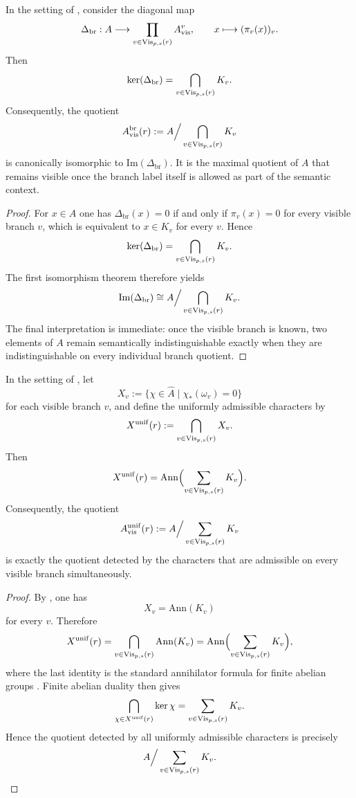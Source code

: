 \begin{theorem}\label{thm:branch-sensitive-visible-quotient}
In the setting of , consider the diagonal map
\[
\Delta_{\mathrm{br}}:A\longrightarrow \prod_{v\in \mathrm{Vis}_{p,s}(r)} A_{\mathrm{vis}}^v,
\qquad
x\longmapsto (\pi_v(x))_v.
\]
Then
\[
\ker(\Delta_{\mathrm{br}})=\bigcap_{v\in \mathrm{Vis}_{p,s}(r)} K_v.
\]
Consequently, the quotient
\[
A_{\mathrm{vis}}^{\mathrm{br}}(r):=A\Big/\bigcap_{v\in \mathrm{Vis}_{p,s}(r)} K_v
\]
is canonically isomorphic to $\mathrm{Im}(\Delta_{\mathrm{br}})$. It is the maximal quotient of $A$ that remains visible once the branch label itself is allowed as part of the semantic context.
\end{theorem}

\begin{proof}
For $x\in A$ one has $\Delta_{\mathrm{br}}(x)=0$ if and only if $\pi_v(x)=0$ for every visible branch $v$, which is equivalent to $x\in K_v$ for every $v$. Hence
\[
\ker(\Delta_{\mathrm{br}})=\bigcap_{v\in \mathrm{Vis}_{p,s}(r)} K_v.
\]
The first isomorphism theorem therefore yields
\[
\mathrm{Im}(\Delta_{\mathrm{br}})
\cong
A\Big/\bigcap_{v\in \mathrm{Vis}_{p,s}(r)} K_v.
\]
The final interpretation is immediate: once the visible branch is known, two elements of $A$ remain semantically indistinguishable exactly when they are indistinguishable on every individual branch quotient.
\end{proof}

\begin{theorem}\label{thm:branch-uniform-visible-quotient}
In the setting of , let
\[
X_v:=\{\chi\in \widehat A\mid \chi_*(\omega_v)=0\}
\]
for each visible branch $v$, and define the uniformly admissible characters by
\[
X^{\mathrm{unif}}(r):=\bigcap_{v\in \mathrm{Vis}_{p,s}(r)} X_v.
\]
Then
\[
X^{\mathrm{unif}}(r)=\mathrm{Ann}\Bigl(\sum_{v\in \mathrm{Vis}_{p,s}(r)} K_v\Bigr).
\]
Consequently, the quotient
\[
A_{\mathrm{vis}}^{\mathrm{unif}}(r):=A\Big/\sum_{v\in \mathrm{Vis}_{p,s}(r)} K_v
\]
is exactly the quotient detected by the characters that are admissible on every visible branch simultaneously.
\end{theorem}

\begin{proof}
By , one has
\[
X_v=\mathrm{Ann}(K_v)
\]
for every $v$. Therefore
\[
X^{\mathrm{unif}}(r)
=
\bigcap_{v\in \mathrm{Vis}_{p,s}(r)} \mathrm{Ann}(K_v)
=
\mathrm{Ann}\Bigl(\sum_{v\in \mathrm{Vis}_{p,s}(r)} K_v\Bigr),
\]
where the last identity is the standard annihilator formula for finite abelian groups \cite[Chap.~5]{DummitFoote2004}. Finite abelian duality then gives
\[
\bigcap_{\chi\in X^{\mathrm{unif}}(r)} \ker\chi
=
\sum_{v\in \mathrm{Vis}_{p,s}(r)} K_v.
\]
Hence the quotient detected by all uniformly admissible characters is precisely
\[
A\Big/\sum_{v\in \mathrm{Vis}_{p,s}(r)} K_v.
\qedhere
\]
\end{proof}

